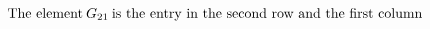 \documentclass[preview]{standalone}
\begin{document}
\begin{align*}
\text{The element}\:G_{ 2 1 }\:\text{is the entry in \linebreak the second row and the first column}
\end{align*}
\end{document}
